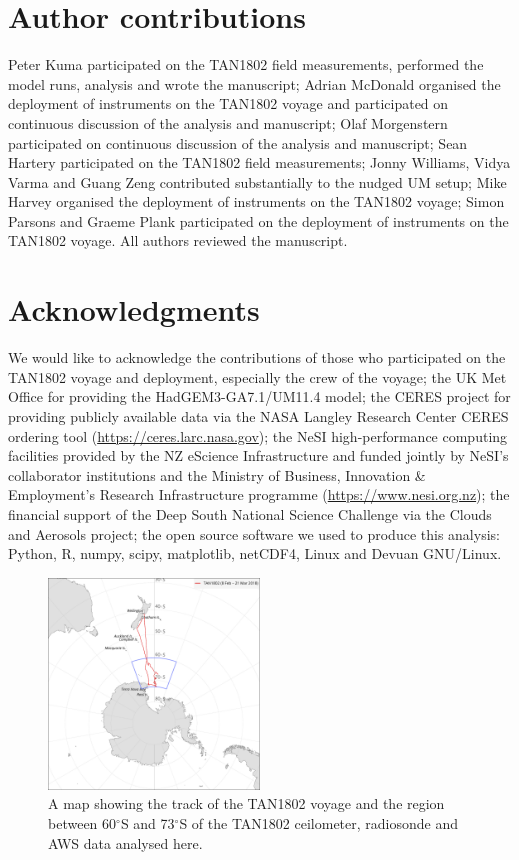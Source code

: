 \section*{Author contributions}

Peter Kuma participated on the TAN1802 field measurements, performed the model runs, analysis and wrote the manuscript;
Adrian McDonald organised the deployment of instruments on the TAN1802 voyage and participated on continuous discussion of the analysis
and manuscript;
Olaf Morgenstern participated on continuous discussion of the analysis and
manuscript;
Sean Hartery participated on the TAN1802 field measurements;
Jonny Williams, Vidya Varma and Guang Zeng contributed substantially to the
nudged UM setup;
Mike Harvey organised the deployment of instruments on the TAN1802 voyage;
Simon Parsons and Graeme Plank participated on the deployment of instruments on the TAN1802
voyage. All authors reviewed the manuscript.

\section*{Acknowledgments}

We would like to acknowledge the contributions of those who participated on
the TAN1802 voyage and deployment, especially the crew of the voyage; the UK Met
Office for providing the HadGEM3-GA7.1/UM11.4 model;
the CERES project for providing publicly available data via the NASA Langley
Research Center CERES ordering tool (\url{https://ceres.larc.nasa.gov});
the
NeSI high-performance computing facilities
provided by the NZ eScience Infrastructure and funded jointly by NeSI's
collaborator institutions and the Ministry of Business, Innovation \&
Employment's Research Infrastructure programme (\url{https://www.nesi.org.nz});
the financial support of the Deep South National Science Challenge via the Clouds and
Aerosols project; the open source software we used to produce this analysis: Python, R,
numpy, scipy, matplotlib,
netCDF4, Linux and Devuan GNU/Linux.

\clearpage

\begin{figure}[t]
\centering
\includegraphics[width=0.5\textwidth]{chapter4/fig/map.pdf}
\caption{A map showing the track of the TAN1802 voyage and the region
between 60$^\circ$S and 73$^\circ$S of the TAN1802 ceilometer, radiosonde
and AWS data analysed here.
}
\label{fig:map}
\end{figure}

